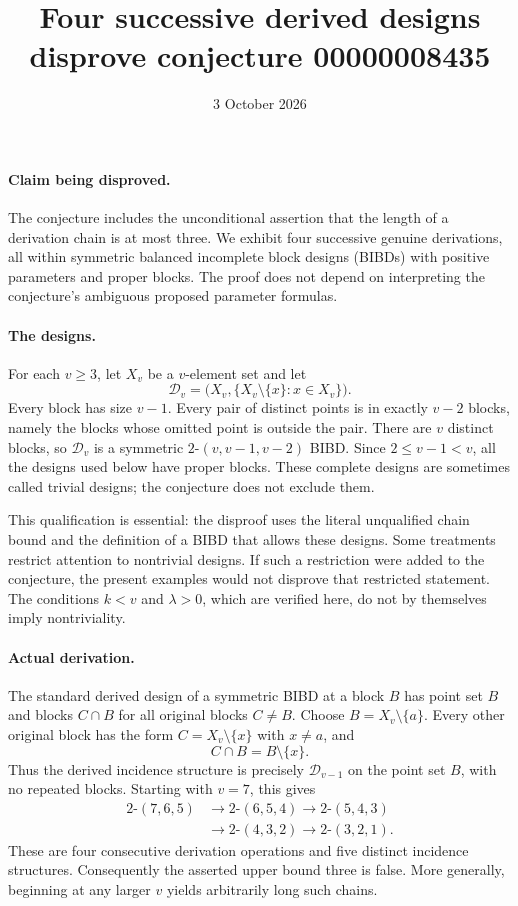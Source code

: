 \documentclass[10pt]{article}
\title{Four successive derived designs disprove conjecture 00000008435}
\author{}
\date{3 October 2026}
\makeatletter
\renewcommand{\maketitle}{\begin{center}
{\Large\bfseries\@title\par}\vspace{0.6em}
{\small\@author\par\@date}
\end{center}\vspace{0.5em}}
\makeatother
\begin{document}
\maketitle
\paragraph{Claim being disproved.}
The conjecture includes the unconditional assertion that the length of a derivation chain is at most three. We exhibit four successive genuine derivations, all within symmetric balanced incomplete block designs (BIBDs) with positive parameters and proper blocks. The proof does not depend on interpreting the conjecture's ambiguous proposed parameter formulas.
\paragraph{The designs.}
For each $v\ge3$, let $X_v$ be a $v$-element set and let
\[
 \mathcal D_v=\bigl(X_v,\{X_v\setminus\{x\}:x\in X_v\}\bigr).
\]
Every block has size $v-1$. Every pair of distinct points is in exactly $v-2$ blocks, namely the blocks whose omitted point is outside the pair. There are $v$ distinct blocks, so $\mathcal D_v$ is a symmetric $2$-$(v,v-1,v-2)$ BIBD. Since $2\le v-1<v$, all the designs used below have proper blocks. These complete designs are sometimes called trivial designs; the conjecture does not exclude them.

This qualification is essential: the disproof uses the literal unqualified chain bound and the definition of a BIBD that allows these designs. Some treatments restrict attention to nontrivial designs. If such a restriction were added to the conjecture, the present examples would not disprove that restricted statement. The conditions $k<v$ and $\lambda>0$, which are verified here, do not by themselves imply nontriviality.
\paragraph{Actual derivation.}
The standard derived design of a symmetric BIBD at a block $B$ has point set $B$ and blocks $C\cap B$ for all original blocks $C\ne B$. Choose $B=X_v\setminus\{a\}$. Every other original block has the form $C=X_v\setminus\{x\}$ with $x\ne a$, and
\[
 C\cap B=B\setminus\{x\}.
\]
Thus the derived incidence structure is precisely $\mathcal D_{v-1}$ on the point set $B$, with no repeated blocks. Starting with $v=7$, this gives
\[
\begin{split}
 2\text{-}(7,6,5)&\longrightarrow 2\text{-}(6,5,4)
 \longrightarrow 2\text{-}(5,4,3)\\
 &\longrightarrow 2\text{-}(4,3,2)
 \longrightarrow 2\text{-}(3,2,1).
\end{split}
\]
These are four consecutive derivation operations and five distinct incidence structures. Consequently the asserted upper bound three is false. More generally, beginning at any larger $v$ yields arbitrarily long such chains.
\end{document}
